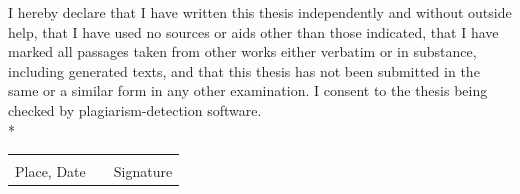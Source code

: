 I hereby declare that I have written this thesis independently and without outside help, that I have used no sources or aids other than those indicated, that I have marked all passages taken from other works either verbatim or in substance, including generated texts, and that this thesis has not been submitted in the same or a similar form in any other examination. I consent to the thesis being checked by plagiarism-detection software.\\*


\vspace{25mm}
\begin{tabular}{@{}p{4cm}p{2cm}p{4cm}@{}}
\hrulefill && \hrulefill\\
Place, Date && Signature\\
\end{tabular}
